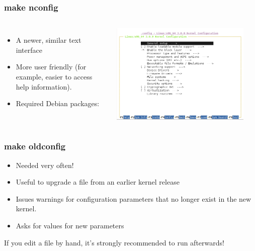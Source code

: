 \begin{frame}
  \frametitle{make nconfig}
  \begin{columns}
    \begin{itemize}
      \item A newer, similar text interface
      \item More user friendly (for example, easier to access help information).
      \item Required Debian packages: 
    \end{itemize}
    \includegraphics[width=0.9\textwidth]{slides/sysdev-linux-intro-configuration/nconfig-screenshot.png}
  \end{columns}
\end{frame}

\begin{frame}
  \frametitle{make oldconfig}
  \begin{itemize}
  \item Needed very often!
  \item Useful to upgrade a  file from an earlier kernel release
  \item Issues warnings for configuration parameters that no longer
    exist in the new kernel.
  \item Asks for values for new parameters
  \end{itemize}
  If you edit a  file by hand, it's strongly recommended
  to run  afterwards!
\end{frame}

